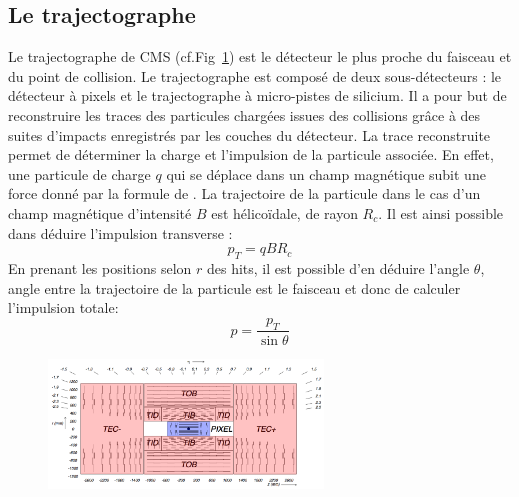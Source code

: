 \subsection{Le trajectographe}
Le trajectographe de CMS (cf.Fig~\ref{trajectographe}) est le détecteur le plus proche du faisceau et du point de collision. Le trajectographe est composé de deux sous-détecteurs : le détecteur à pixels et le trajectographe à micro-pistes de silicium. Il a pour but de reconstruire les traces des particules chargées issues des collisions grâce à des suites d'impacts enregistrés par les couches du détecteur. La trace reconstruite permet de déterminer la charge et l'impulsion de la particule associée. En effet, une particule de charge $q$ qui se déplace dans un champ magnétique subit une force donné par la formule de . La trajectoire de la particule dans le cas d'un champ magnétique d'intensité $B$ est hélicoïdale, de rayon $R_{c}$. Il est ainsi possible dans déduire l'impulsion transverse :
\begin{equation}
p_{T}=qBR_{c}
\end{equation}
En prenant les positions selon $r$ des hits, il est possible d'en déduire l'angle $\theta$, angle entre la trajectoire de la particule est le faisceau et donc de calculer l'impulsion totale:
\begin{equation}
p=\frac{p_{T}}{\sin\theta}
\end{equation}
\begin{figure}[ht!]
	\centering
	\includegraphics[width=0.65\textwidth]{CMS/tracker.png}
	\label{trajectographe}
\end{figure}

